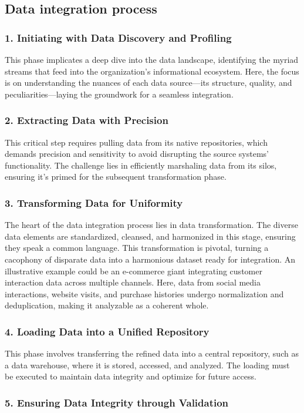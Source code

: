 \documentclass[12pt]{book}
\begin{document}
\subsection{Data integration process}
\subsubsection{1. Initiating with Data Discovery and Profiling}
This phase implicates a deep dive into the data landscape, identifying the myriad streams that feed into the organization's informational ecosystem. Here, the focus is on understanding the nuances of each data source—its structure, quality, and peculiarities—laying the groundwork for a seamless integration.
\subsubsection{2. Extracting Data with Precision}
This critical step requires pulling data from its native repositories, which demands precision and sensitivity to avoid disrupting the source systems' functionality. The challenge lies in efficiently marshaling data from its silos, ensuring it's primed for the subsequent transformation phase.
\subsubsection{3. Transforming Data for Uniformity}
The heart of the data integration process lies in data transformation. The diverse data elements are standardized, cleansed, and harmonized in this stage, ensuring they speak a common language. This transformation is pivotal, turning a cacophony of disparate data into a harmonious dataset ready for integration.
An illustrative example could be an e-commerce giant integrating customer interaction data across multiple channels. Here, data from social media interactions, website visits, and purchase histories undergo normalization and deduplication, making it analyzable as a coherent whole.
\subsubsection{4. Loading Data into a Unified Repository}
This phase involves transferring the refined data into a central repository, such as a data warehouse, where it is stored, accessed, and analyzed. The loading must be executed to maintain data integrity and optimize for future access.
\subsubsection{5. Ensuring Data Integrity through Validation}
\end{document}
